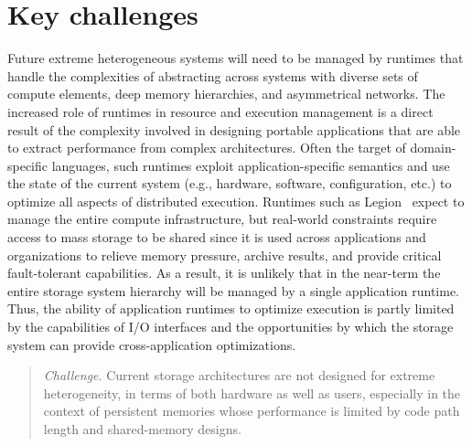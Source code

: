 \documentclass{sig-alternate}
\begin{document}

\date{\today}

\maketitle

\section{Key challenges}

Future extreme heterogeneous systems will need to be managed by runtimes that handle the
complexities of abstracting across systems with diverse sets of compute
elements, deep memory hierarchies, and asymmetrical networks.  The increased
role of runtimes in resource and execution management is a direct result of the
complexity involved in designing portable applications that are able to extract
performance from complex architectures.  Often the target of domain-specific
languages, such runtimes exploit application-specific semantics and use the
state of the current system (e.g., hardware, software, configuration, etc.) to
optimize all aspects of distributed execution. Runtimes such as Legion~\cite{bauer:sc12-legion}
expect to manage the entire compute infrastructure, but real-world constraints
require access to mass storage to be shared since it is used across applications
and organizations to relieve memory pressure, archive results, and provide
critical fault-tolerant capabilities. As a result, it is unlikely that in the
near-term the entire storage system hierarchy will be managed by a single
application runtime. Thus, the ability of application runtimes to optimize
execution is partly limited by the capabilities of I/O interfaces and the
opportunities by which the storage system can provide cross-application optimizations.

\begin{quote}
	\emph{Challenge}. Current storage architectures are not designed for extreme
heterogeneity, in terms of both hardware as well as users, especially
in the context of persistent memories whose performance is limited by code path
length and shared-memory designs.
\end{quote}
\end{document}
